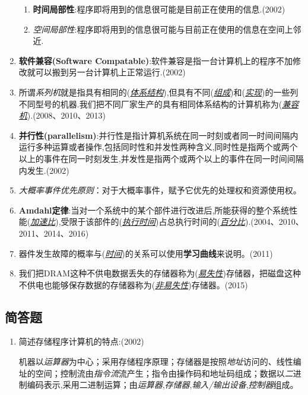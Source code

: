 \documentclass[a4paper]{ctexart}
\newcommand{\blank}[1]{(\emph{\underline{#1}})}
\begin{document}
\begin{enumerate}
  \begin{enumerate}
    \item \textbf{时间局部性}:程序即将用到的信息很可能是目前正在使用的信息.(2002)
    \item \emph{空间局部性}:程序即将用到的信息很可能与目前正在使用的信息在空间上邻近.
  \end{enumerate}
  \item \textbf{软件兼容(Software Compatable)}:软件兼容是指一台计算机上的程序不加修改就可以搬到另一台计算机上正常运行.(2002)
  \item 所谓\emph{系列机}就是指具有相同的(\emph{\underline{体系结构}}),但具有不同(\emph{\underline{组成}})和(\emph{\underline{实现}})的一些列不同型号的机器.我们把不同厂家生产的具有相同体系结构的计算机称为(\emph{\underline{兼容机}}).(2008、2010、2013)
  \item \textbf{并行性(parallelism)}:并行性是指计算机系统在同一时刻或者同一时间间隔内运行多种运算或者操作,包括同时性和并发性两种含义,同时性是指两个或两个以上的事件在同一时刻发生,并发性是指两个或两个以上的事件在同一时间间隔内发生.(2002)
  \item \emph{大概率事件优先原则}：对于大概率事件，赋予它优先的处理权和资源使用权。
  \item \textbf{Amdahl定律}:当对一个系统中的某个部件进行改进后,所能获得的整个系统性能\blank{加速比},受限于该部件的\blank{执行时间}占总执行时间的\blank{百分比}.(2004、2010、2011、2014、2016)
  \item 器件发生故障的概率与\blank{时间}的关系可以使用\textbf{学习曲线}来说明。(2011)
  \item 我们把DRAM这种不供电数据丢失的存储器称为\blank{易失性}存储器，把磁盘这种不供电也能够保存数据的存储器称为\blank{非易失性}存储器。(2015)
\end{enumerate}
\subsection{简答题}
\begin{enumerate}
  \item {\color{grey}简述存储程序计算机的特点:(2002)
  
  机器以\emph{运算器}为中心；采用存储程序原理；存储器是按照\emph{地址}访问的、线性编址的空间；控制流由\emph{指令流}流产生；指令由操作码和地址码组成；数据以\emph{二}进制编码表示,采用二进制运算；由\emph{运算器},\emph{存储器},\emph{输入/输出设备},\emph{控制器}组成。}

  
\end{enumerate}

\newpage
\end{document}

